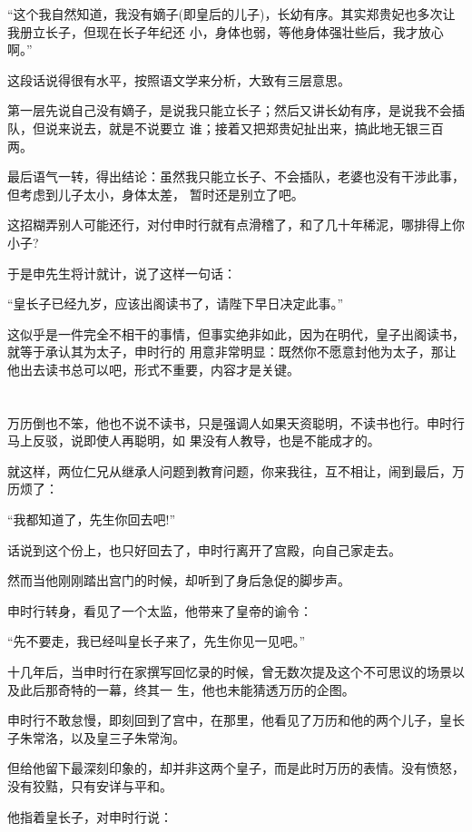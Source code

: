 \documentclass[11pt,a4paper,onecolumn]{article}
\begin{document}
``这个我自然知道，我没有嫡子(即皇后的儿子)，长幼有序。其实郑贵妃也多次让我册立长子，但现在长子年纪还
小，身体也弱，等他身体强壮些后，我才放心啊。''

这段话说得很有水平，按照语文学来分析，大致有三层意思。

第一层先说自己没有嫡子，是说我只能立长子；然后又讲长幼有序，是说我不会插队，但说来说去，就是不说要立
谁；接着又把郑贵妃扯出来，搞此地无银三百两。

最后语气一转，得出结论：虽然我只能立长子、不会插队，老婆也没有干涉此事，但考虑到儿子太小，身体太差，
暂时还是别立了吧。

这招糊弄别人可能还行，对付申时行就有点滑稽了，和了几十年稀泥，哪排得上你小子?

于是申先生将计就计，说了这样一句话：

``皇长子已经九岁，应该出阁读书了，请陛下早日决定此事。''

这似乎是一件完全不相干的事情，但事实绝非如此，因为在明代，皇子出阁读书，就等于承认其为太子，申时行的
用意非常明显：既然你不愿意封他为太子，那让他出去读书总可以吧，形式不重要，内容才是关键。

\section[\thesection]{}

万历倒也不笨，他也不说不读书，只是强调人如果天资聪明，不读书也行。申时行马上反驳，说即使人再聪明，如
果没有人教导，也是不能成才的。

就这样，两位仁兄从继承人问题到教育问题，你来我往，互不相让，闹到最后，万历烦了：

``我都知道了，先生你回去吧!''

话说到这个份上，也只好回去了，申时行离开了宫殿，向自己家走去。

然而当他刚刚踏出宫门的时候，却听到了身后急促的脚步声。

申时行转身，看见了一个太监，他带来了皇帝的谕令：

``先不要走，我已经叫皇长子来了，先生你见一见吧。''

十几年后，当申时行在家撰写回忆录的时候，曾无数次提及这个不可思议的场景以及此后那奇特的一幕，终其一
生，他也未能猜透万历的企图。

申时行不敢怠慢，即刻回到了宫中，在那里，他看见了万历和他的两个儿子，皇长子朱常洛，以及皇三子朱常洵。

但给他留下最深刻印象的，却并非这两个皇子，而是此时万历的表情。没有愤怒，没有狡黠，只有安详与平和。

他指着皇长子，对申时行说：
\end{document}
